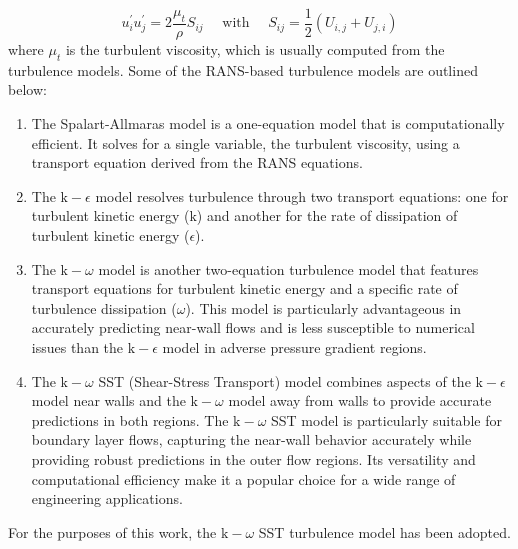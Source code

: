 \begin{equation}
  u_i^{\prime} u_j^{\prime}=2 \frac{\mu_t}{\rho} S_{i j} \quad \text { with } \quad S_{i j}=\frac{1}{2}\left(U_{i, j}+U_{j, i}\right)
\end{equation}
where $\mu_t$ is the turbulent viscosity, which is usually computed from the turbulence models. Some of the RANS-based turbulence models are outlined below: 
\begin{enumerate}
  \item The Spalart-Allmaras model is a one-equation model that is computationally efficient. It solves for a single variable, the turbulent viscosity, using a transport equation derived from the RANS equations. 
  \item The $\text{k}-\epsilon$ model resolves turbulence through two transport equations: one for turbulent kinetic energy ($\text{k}$) and another for the rate of dissipation of turbulent kinetic energy ($\epsilon$). 
  \item The $\text{k}-\omega$ model is another two-equation turbulence model that features transport equations for turbulent kinetic energy and a specific rate of turbulence dissipation ($\omega$). This model is particularly advantageous in accurately predicting near-wall flows and is less susceptible to numerical issues than the $\text{k}-\epsilon$ model in adverse pressure gradient regions. 
  \item The $\text{k}-\omega$  SST (Shear-Stress Transport) model combines aspects of the $\text{k}-\epsilon$ model near walls and the $\text{k}-\omega$ model away from walls to provide accurate predictions in both regions. The $\text{k}-\omega$ SST model is particularly suitable for boundary layer flows, capturing the near-wall behavior accurately while providing robust predictions in the outer flow regions. Its versatility and computational efficiency make it a popular choice for a wide range of engineering applications.
\end{enumerate}
For the purposes of this work, the $\text{k}-\omega$ SST turbulence model has been adopted.
